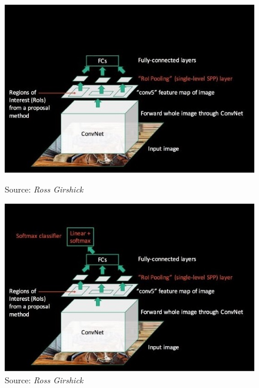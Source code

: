 \begin{frame}
	\vspace{1cm}
	\begin{columns}
		\begin{overlayarea}{\textwidth}{\textheight}
			\begin{figure}[h!]
				\begin{overprint}
					\centering\includegraphics[scale= 0.45]{images/42_fc}\caption[Caption]{\hspace{-90pt} Source: \it{Ross Girshick}}
					\centering\includegraphics[scale= 0.45]{images/42}\caption[Caption]{\hspace{-90pt} Source: \it{Ross Girshick}}

\end{overprint}
\end{figure}
\end{overlayarea}
\end{columns}
\end{frame}
